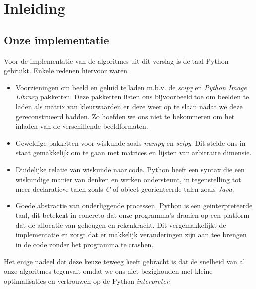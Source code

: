 \documentclass[11pt]{uvamath}
\theoremstyle{plain}
\theoremstyle{definition}
\theoremstyle{remark}
\begin{document}
\tableofcontents
\newpage

\chapter*{Inleiding}

\section*{Onze implementatie}
Voor de implementatie van de algoritmes uit dit verslag is de taal Python gebruikt.
Enkele redenen hiervoor waren:
\begin{itemize}
\item Voorzieningen om beeld en geluid te laden m.b.v. de \emph{scipy}\cite{scipy} en \emph{Python Image Library}\cite{pil} pakketten.
  Deze pakketten lieten ons bijvoorbeeld toe om beelden te laden als matrix van kleurwaarden en deze weer op te slaan
  nadat we deze gereconstrueerd hadden. Zo hoefden we ons niet te bekommeren om het inladen van de verschillende beeldformaten.
\item Geweldige pakketten voor wiskunde zoals \emph{numpy}\cite{numpy} en \emph{scipy}. Dit stelde ons in staat gemakkelijk om te gaan met matrices en lijsten van arbitraire dimensie.
\item Duidelijke relatie van wiskunde naar code. Python heeft een syntax die een wiskundige manier van denken en werken
  ondersteunt, in tegenstelling tot meer declaratieve talen zoals \emph{C} of object-georienteerde talen zoals \emph{Java}.
\item Goede abstractie van onderliggende processen. Python is een geinterpreteerde taal, dit betekent in concreto
  dat onze programma's draaien op een platform dat de allocatie van geheugen en rekenkracht. Dit vergemakkelijkt
  de implementatie en zorgt dat er makkelijk veranderingen zijn aan tee brengen in de code zonder het programma te crashen.
\end{itemize}
Het enige nadeel dat deze keuze teweeg heeft gebracht is dat de snelheid van al onze algoritmes tegenvalt
omdat we ons niet bezighouden met kleine optimalisaties en vertrouwen op de Python \emph{interpreter}.










\end{document}
